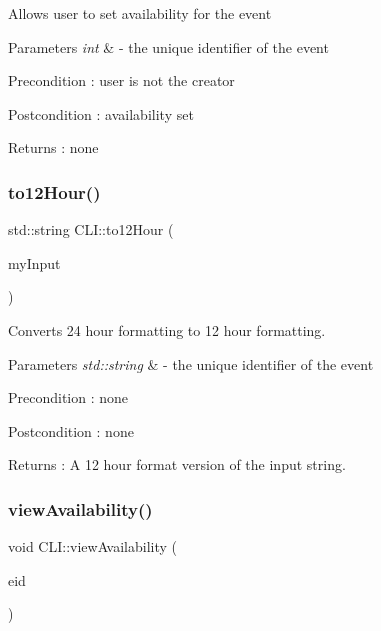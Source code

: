 Allows user to set availability for the event 
\begin{DoxyParams}{Parameters}
{\em int} & -\/ the unique identifier of the event \\
\hline
\end{DoxyParams}
\begin{DoxyPrecond}{Precondition}
\+: user is not the creator 
\end{DoxyPrecond}
\begin{DoxyPostcond}{Postcondition}
\+: availability set 
\end{DoxyPostcond}
\begin{DoxyReturn}{Returns}
\+: none 
\end{DoxyReturn}
\mbox{\label{class_c_l_i_ae6622010128f1170365f1e533721107e}} 
\subsubsection{\texorpdfstring{to12\+Hour()}{to12Hour()}}
{\footnotesize\ttfamily std\+::string C\+L\+I\+::to12\+Hour (\begin{DoxyParamCaption}\item[{std\+::string}]{my\+Input }\end{DoxyParamCaption})}

Converts 24 hour formatting to 12 hour formatting. 
\begin{DoxyParams}{Parameters}
{\em std\+::string} & -\/ the unique identifier of the event \\
\hline
\end{DoxyParams}
\begin{DoxyPrecond}{Precondition}
\+: none 
\end{DoxyPrecond}
\begin{DoxyPostcond}{Postcondition}
\+: none 
\end{DoxyPostcond}
\begin{DoxyReturn}{Returns}
\+: A 12 hour format version of the input string. 
\end{DoxyReturn}
\mbox{\label{class_c_l_i_aaaacd336786c8f895b349889866cf610}} 
\subsubsection{\texorpdfstring{view\+Availability()}{viewAvailability()}}
{\footnotesize\ttfamily void C\+L\+I\+::view\+Availability (\begin{DoxyParamCaption}\item[{int}]{eid }\end{DoxyParamCaption})}

